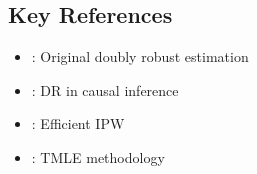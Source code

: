 \subsection{Key References}

\begin{itemize}
    \item \cite{robins1994estimation}: Original doubly robust estimation
    \item \cite{bang2005doubly}: DR in causal inference
    \item \cite{hirano2003efficient}: Efficient IPW
    \item \cite{vdl2011tmle}: TMLE methodology
\end{itemize}
